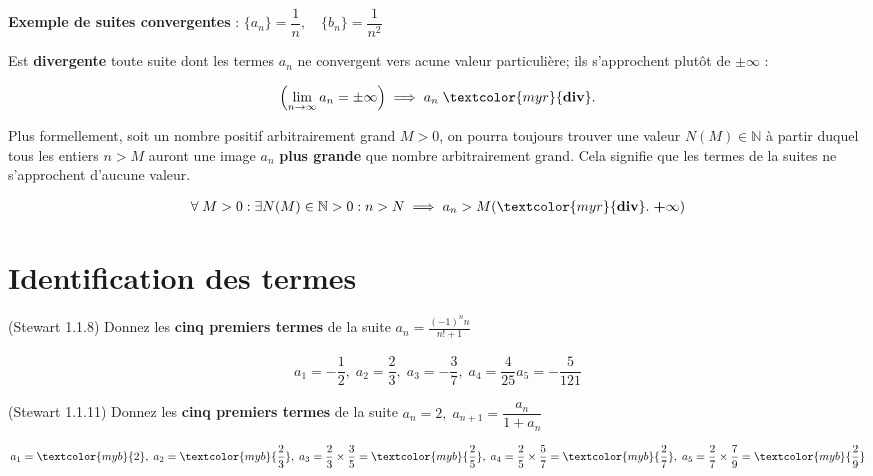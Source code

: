 \documentclass{report}
\begin{document}
    \textbf{Exemple de suites convergentes} : 
    $\{a_n \} = \dfrac{1}{n}, \quad%
    \{b_n\} = \dfrac{1}{n^2}$   


    \vspace{2em}
    Est \textcolor{myr}{\textbf{divergente}} toute suite dont les termes $a_n$ ne 
    convergent vers acune valeur particulière; ils s'approchent plutôt 
    de $\pm \infty$ :

      \begin{align*}
          \left(\lim\limits_{n\to\infty}a_n = \pm \infty \right) \implies 
          a_n \; \textcolor{myr}{\textbf{div}}.    
      \end{align*}

    Plus formellement, soit un nombre positif arbitrairement grand $M > 0$, 
    on pourra toujours trouver une valeur $N(M) \in \mathbb{N}$ à partir duquel tous les 
    entiers $n > M$ auront une image $a_n$ \textbf{plus grande} 
    que nombre arbitrairement 
    grand. Cela signifie que les termes de la suites ne s'approchent d'aucune 
    valeur. 

    \begin{align*}
    \forall \; M > 0 : \exists N(M) \in \mathbb{N} > 0 : n > N 
    \implies a_n > M (\textcolor{myr}{\textbf{div}}. \; \textbf{+}\infty ) 
    \end{align*}

    
    \section{Identification des termes}
    \begin{Exercice}{(Stewart 1.1.8)}{}
        Donnez les \textbf{cinq premiers termes} de la suite 
        $a_{n}=\frac{\left(-1\right)^{n}n}{n!+1}$ 
    \end{Exercice}


    \begin{align*}
        a_1 = -\dfrac{1}{2}, \; a_2 = \dfrac{2}{3}, \; 
        a_3 = -\dfrac{3}{7}, \; 
        a_4 = \dfrac{4}{25} 
        a_5 = -\dfrac{5}{121} 
    \end{align*}                


    \begin{Exercice}{(Stewart 1.1.11)}{}
        Donnez les \textbf{cinq premiers termes} de la suite 
        $a_n = 2, \; a_{n+1} = \dfrac{a_n}{1 + a_n}$
    \end{Exercice}              


    \begin{align*}
        a_1 = \textcolor{myb}{2}, \; a_2 = \textcolor{myb}{\dfrac{2}{3}}, \; 
        a_3 = \dfrac{2}{3} \times \dfrac{3}{5} = \textcolor{myb}{\dfrac{2}{5}}, \; 
        a_4 = \dfrac{2}{5} \times \dfrac{5}{7}  = \textcolor{myb}{\dfrac{2}{7}}, \;
        a_5 = \dfrac{2}{7} \times \dfrac{7}{9} = \textcolor{myb}{\dfrac{2}{9}}
    \end{align*}    
\end{document}
